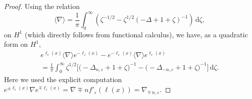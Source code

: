 \documentclass[12pt]{article}
\theoremstyle{plain}
\begin{document}
	\begin{proof}
	   Using 
	   the relation
\begin{equation*}
			\langle\nabla\rangle = \frac{1}{\pi} \int_0^\infty\left( \zeta^{-1/2} - \zeta^{1/2}(-\Delta+1+\zeta)^{-1} \right)\, \mathrm{d}\zeta,
		\end{equation*}
on $H^1$ (which directly follows from functional calculus), we have, as a quadratic form on $H^1$,
\begin{multline}
   e^{\ell_\varepsilon(x)} \langle\nabla\rangle e^{-\ell_\varepsilon(x)}-e^{-\ell_\varepsilon(x)} \langle\nabla\rangle e^{\ell_\varepsilon(x)} \\
   =\frac{1}{\pi} \int_0^\infty \zeta^{1/2}\Big[\big(-\Delta_{n,\varepsilon}+1+\zeta\big)^{-1}-\big(-\Delta_{- n,\varepsilon}+1+\zeta\big)^{-1}\Big]\, \mathrm{d}\zeta. \label{eq:int-imaginary-part}
\end{multline}
Here we used the explicit computation $e^{\pm \ell_\varepsilon(x)} \nabla e^{\mp \ell_\varepsilon(x)} = \nabla \mp n f'_\varepsilon(\ell(x)) = \nabla_{\mp\, n,\varepsilon}$.



\end{proof}
\end{document}
